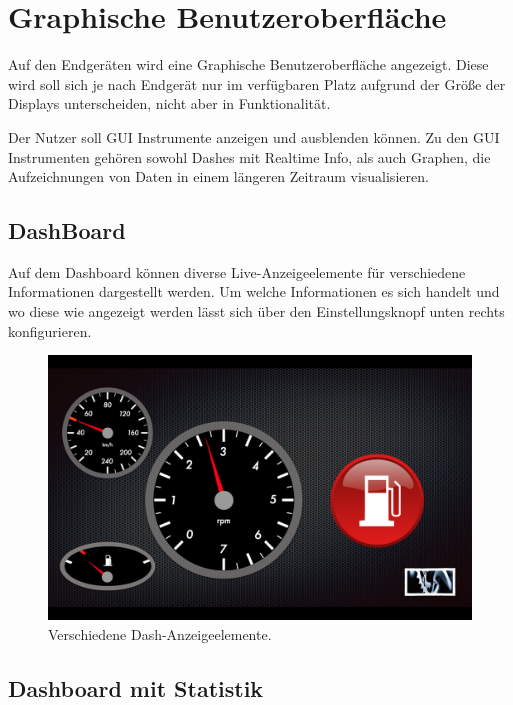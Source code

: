 \documentclass[pflichtenheft.tex]{subfiles}
\begin{document}
\chapter{Graphische Benutzeroberfläche}
Auf den Endgeräten wird eine Graphische Benutzeroberfläche angezeigt. Diese wird soll sich je nach Endgerät nur im verfügbaren Platz aufgrund der Größe der Displays unterscheiden, nicht aber in Funktionalität.

Der Nutzer soll GUI Instrumente anzeigen und ausblenden können. Zu den GUI Instrumenten gehören sowohl Dashes mit Realtime Info, als auch Graphen, die Aufzeichnungen von Daten in einem längeren Zeitraum visualisieren.


\section{DashBoard}

Auf dem Dashboard können diverse Live-Anzeigeelemente für verschiedene Informationen dargestellt werden. Um welche Informationen es sich handelt und wo diese wie angezeigt werden lässt sich über den Einstellungsknopf unten rechts konfigurieren.

\begin{figure}[H]
  	\begin{center}
 		\includegraphics[width=\textwidth]{Images/GUI-Dash.png}
  		\caption{Verschiedene Dash-Anzeigeelemente.}
  	\end{center}
\end{figure}


\section{Dashboard mit Statistik}
\end{document}
